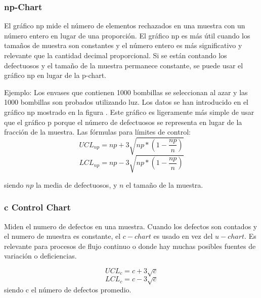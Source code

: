 \documentclass[]{article}
\begin{document}
\subsubsection{np-Chart}
El gráfico np mide el número de elementos rechazados en una muestra con un número entero en lugar de una proporción. El gráfico np es más útil cuando los tamaños de muestra son constantes y el número entero es más significativo y relevante que la cantidad decimal proporcional.
Si se están contando los defectuosos y el tamaño de la muestra permanece constante, se puede usar el gráfico np en lugar de la p-chart.

Ejemplo: Los envases que contienen 1000 bombillas se seleccionan al azar y las 1000 bombillas son probados utilizando luz. Los datos se han introducido en el gráfico np mostrado en la figura . Este gráfico es ligeramente más simple de usar que el gráfico p porque el número de defectuosos se representa en lugar de la fracción de la muestra.
Las fórmulas para límites de control:
\begin{equation}
UCL_{np} = np + 3 \sqrt{np*(1-\frac{np}{n})}
\end{equation}
\begin{equation}
LCL_{np} = np - 3 \sqrt{np*(1-\frac{np}{n})}
\end{equation}

siendo $np$ la media de defectuosos, y $n$ el tamaño de la muestra.

\subsubsection{c Control Chart}

Miden el numero de defectos en una muestra. Cuando los defectos son contados y el numero de muestra es constante, el $c-chart$ es usado en vez del $u-chart$. Es relevante para procesos de flujo continuo o donde hay muchas posibles fuentes de variación o deficiencias.

\begin{equation}
UCL_c = c + 3\sqrt{c}
\end{equation}
\begin{equation}
LCL_c = c - 3\sqrt{c}
\end{equation}
siendo c el número de defectos promedio.
\end{document}
